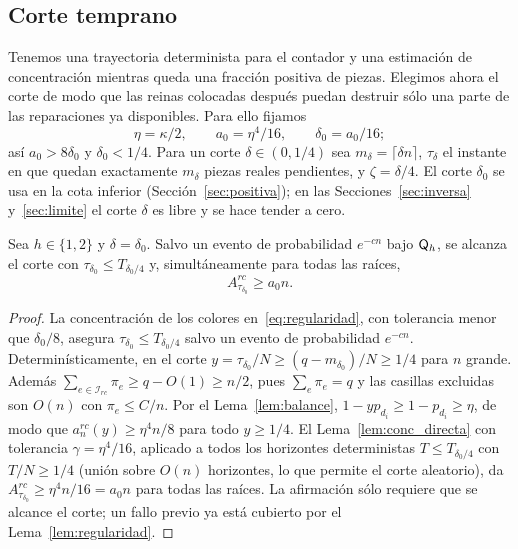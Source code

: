 \subsection{Corte temprano}

Tenemos una trayectoria determinista para el contador y una estimación de
concentración mientras queda una fracción positiva de piezas. Elegimos ahora el
corte de modo que las reinas colocadas después puedan destruir sólo una parte de
las reparaciones ya disponibles. Para ello fijamos
\begin{equation}\label{eq:constantes}
 \eta=\kappa/2,\qquad a_0=\eta^4/16,\qquad \delta_0=a_0/16;
\end{equation}
así $a_0>8\delta_0$ y $\delta_0<1/4$. Para un corte $\delta\in(0,1/4)$ sea
$m_\delta=\lceil\delta n\rceil$, $\tau_\delta$ el instante en que quedan exactamente $m_\delta$
piezas reales pendientes, y $\zeta=\delta/4$. El corte $\delta_0$ se usa en la cota inferior
(Sección~\ref{sec:positiva}); en las Secciones~\ref{sec:inversa} y~\ref{sec:limite} el corte
$\delta$ es libre y se hace tender a cero.

\begin{lema}\label{lem:corte}
Sea $h\in\{1,2\}$ y $\delta=\delta_0$. Salvo un evento de probabilidad $e^{-cn}$ bajo $\mathsf{Q}_h$, se
alcanza el corte con $\tau_{\delta_0}\le T_{\delta_0/4}$ y, simultáneamente para todas las raíces,
\begin{equation}\label{eq:corte}
 A^{rc}_{\tau_{\delta_0}}\ge a_0n .
\end{equation}
\end{lema}

\begin{proof}
La concentración de los colores en~\eqref{eq:regularidad}, con tolerancia menor que $\delta_0/8$,
asegura $\tau_{\delta_0}\le T_{\delta_0/4}$ salvo un evento de probabilidad $e^{-cn}$. Determinísticamente,
en el corte $y=\tau_{\delta_0}/N\ge(q-m_{\delta_0})/N\ge1/4$ para $n$ grande. Además
$\sum_{e\in\mathcal I_{rc}}\pi_e\ge q-O(1)\ge n/2$, pues $\sum_e\pi_e=q$ y las casillas excluidas
son $O(n)$ con $\pi_e\le C/n$. Por el Lema~\ref{lem:balance}, $1-yp_{d_i}\ge1-p_{d_i}\ge\eta$, de
modo que $a_n^{rc}(y)\ge\eta^4n/8$ para todo $y\ge1/4$. El Lema~\ref{lem:conc_directa} con
tolerancia $\gamma=\eta^4/16$, aplicado a todos los horizontes deterministas $T\le T_{\delta_0/4}$ con
$T/N\ge1/4$ (unión sobre $O(n)$ horizontes, lo que permite el corte aleatorio), da
$A^{rc}_{\tau_{\delta_0}}\ge\eta^4n/16=a_0n$ para todas las raíces. La afirmación sólo requiere que
se alcance el corte; un fallo previo ya está cubierto por el Lema~\ref{lem:regularidad}.
\end{proof}

